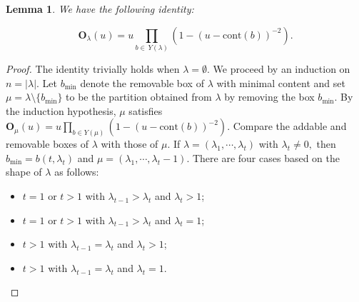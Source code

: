 \documentclass[12pt]{amsart}
\numberwithin{itemcounter}{subsection}
\theoremstyle{plain}
\newtheorem{lemma}[theorem]{Lemma}
\theoremstyle{definition}
\theoremstyle{remark}
\numberwithin{equation}{section}
\def\bfO{\mathbf{O}}
\def\min{{\operatorname{min}\nolimits}}
\begin{document}
							\begin{lemma}
								We have the following identity:

								$$\bfO_{\lambda}(u)=u\prod\limits_{b\in \,Y(\lambda)}(1-(u-\mathrm{cont}(b))^{-2}).$$
							\end{lemma}
							\begin{proof}
								The identity trivially holds when $\lambda=\emptyset$.
								We proceed by an induction on $n=|\lambda|.$
								Let $b_{\min}$ denote the removable box of $\lambda$ with minimal content and set $\mu=\lambda\setminus \{b_\min\}$ to be the partition obtained from $\lambda$ by removing the box $b_\min.$ By the induction hypothesis, $\mu$ satisfies
								$\bfO_{\mu}(u)=u\prod\limits_{b\in Y(\mu)}(1-(u-\mathrm{cont}(b))^{-2}).$
                                Compare the addable and removable boxes of $\lambda$ with those of $\mu.$ If $\lambda=(\lambda_1,\cdots,\lambda_t)$ with $\lambda_t\neq 0,$ then $b_\min=b(t,\lambda_t)$ and $\mu=(\lambda_1,\cdots,\lambda_t-1).$
								There are four cases based on the shape of $\lambda$ as follows:
								\begin{itemize}
									\item[$(1)$] $t=1$ or $t>1$ with $ \lambda_{t-1}>\lambda_{t}$ and $\lambda_t>1$;
									\item[$(2)$] $t=1$ or $t>1$ with $\lambda_{t-1}>\lambda_{t}$ and $\lambda_t=1$;
									\item[$(3)$] $t>1$ with $ \lambda_{t-1}=\lambda_{t}$ and $\lambda_t>1$;
									\item[$(4)$] $t>1$ with $\lambda_{t-1}=\lambda_{t}$ and $\lambda_t=1$.
								\end{itemize}


\end{proof}
\end{document}
